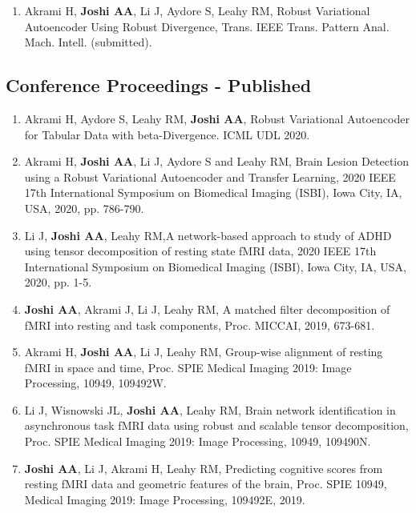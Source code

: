 \documentclass[overlapped,line,letterpaper]{res}
\begin{document}
\begin{resume}
\begin{enumerate}
\item Akrami H, \textbf{Joshi AA}, Li J, Aydore S, Leahy RM, {Robust Variational Autoencoder Using Robust Divergence}, Trans. IEEE Trans. Pattern Anal. Mach. Intell. (submitted).

\end{enumerate}

\subsection{Conference Proceedings - Published}
\begin{enumerate}

    \item Akrami H, Aydore S, Leahy RM, \textbf{Joshi AA}, {Robust Variational Autoencoder for Tabular Data with beta-Divergence}. ICML UDL 2020.

    \item Akrami H, \textbf{Joshi AA}, Li J, Aydore S and Leahy RM, {Brain Lesion Detection using a Robust Variational Autoencoder and Transfer Learning}, 2020 IEEE 17th International Symposium on Biomedical Imaging (ISBI), Iowa City, IA, USA, 2020, pp. 786-790.

    \item Li J, \textbf{Joshi AA}, Leahy RM,{A network-based approach to study of ADHD using tensor decomposition of resting state fMRI data}, 2020 IEEE 17th International Symposium on Biomedical Imaging (ISBI), Iowa City, IA, USA, 2020, pp. 1-5.
    
    \item \textbf{Joshi AA}, Akrami J, Li J, Leahy RM, {A matched filter decomposition of fMRI into resting and task components}, Proc. MICCAI, 2019, 673-681.

    \item Akrami H, \textbf{Joshi AA}, Li J, Leahy RM, {Group-wise alignment of resting fMRI in space and time}, {Proc. SPIE Medical Imaging 2019}: Image Processing, 10949, 109492W.

    \item Li J, Wisnowski JL, \textbf{Joshi AA}, Leahy RM, {Brain network identification in asynchronous task fMRI data using robust and scalable tensor decomposition}, {Proc. SPIE Medical Imaging 2019}: Image Processing, 10949, 109490N. 

    \item \textbf{Joshi AA}, Li J, Akrami H, Leahy RM, {Predicting cognitive scores from resting fMRI data and geometric features of the brain}, {Proc. SPIE 10949, Medical Imaging 2019}: Image Processing, 109492E, 2019.
    

\end{enumerate}
\end{resume}
\end{document}
